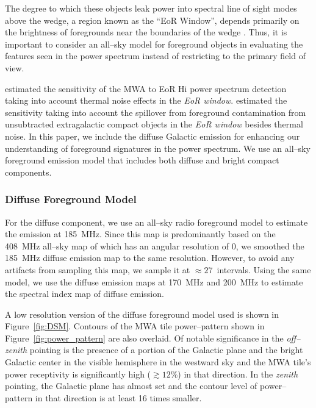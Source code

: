 \documentclass[preprint2,iop,numberedappendix]{emulateapj}
\begin{document}
The degree to which these objects leak power into spectral line of sight modes above the wedge, a region known as the ``EoR Window'', depends primarily on the brightness of foregrounds near the boundaries of the wedge \citep{thy13,pob13,ved12,par12}. Thus, it is important to consider an all--sky model for foreground objects in evaluating the features seen in the power spectrum instead of restricting to the primary field of view. 

\citet{bea13} estimated the sensitivity of the MWA to EoR H{\sc i} power spectrum detection taking into account thermal noise effects in the {\it EoR window}. \citet{thy13} estimated the sensitivity taking into account the spillover from foreground contamination from unsubtracted extragalactic compact objects in the {\it EoR window} besides thermal noise. In this paper, we include the diffuse Galactic emission for enhancing our understanding of foreground signatures in the power spectrum. We use an all--sky foreground emission model that includes both diffuse and bright compact components.  

\subsubsection{Diffuse Foreground Model}\label{sec:DSM}

For the diffuse component, we use an all--sky radio foreground model \citep{deo08} to estimate the emission at 185~MHz. Since this map is predominantly based on the 408~MHz all--sky map of \citet{has82} which has an angular resolution of 0, we smoothed the 185~MHz diffuse emission map to the same resolution. However, to avoid any artifacts from sampling this map, we sample it at $\approx 27$\arcmin~intervals. Using the same model, we use the diffuse emission maps at 170~MHz and 200~MHz to estimate the spectral index map of diffuse emission.  

A low resolution version of the diffuse foreground model used is shown in Figure~\ref{fig:DSM}. Contours of the MWA tile power--pattern shown in Figure~\ref{fig:power_pattern} are also overlaid. Of notable significance in the {\it off--zenith} pointing is the presence of a portion of the Galactic plane and the bright Galactic center in the visible hemisphere in the westward sky and the MWA tile's power receptivity is significantly high ($\gtrsim 12$\%) in that direction. In the {\it zenith} pointing, the Galactic plane has almost set and the contour level of power--pattern in that direction is at least 16 times smaller. 
\end{document}
